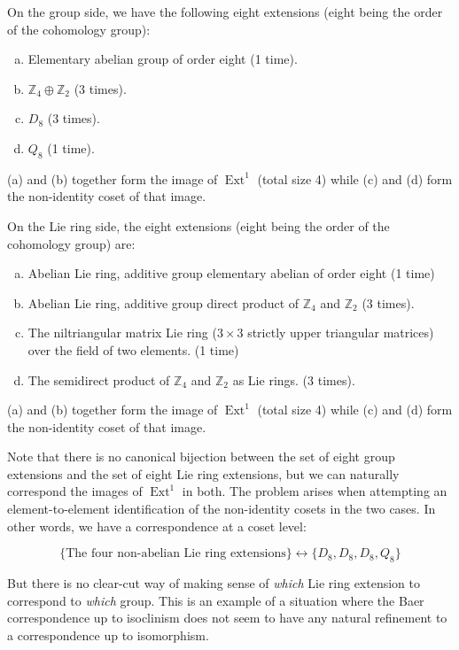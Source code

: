 \documentclass[10pt]{amsart}
\begin{document}
On the group side, we have the following eight extensions (eight being
the order of the cohomology group):

\begin{enumerate}[(a)]
\item Elementary abelian group of order eight (1 time).
\item $\mathbb{Z}_4 \oplus \mathbb{Z}_2$ (3 times).
\item $D_8$ (3 times).
\item $Q_8$ (1 time).
\end{enumerate}

(a) and (b) together form the image of $\operatorname{Ext}^1$ (total
size 4) while (c) and (d) form the non-identity coset of that
image.

On the Lie ring side, the eight extensions (eight being the order of the cohomology group) are:

\begin{enumerate}[(a)]
\item Abelian Lie ring, additive group elementary abelian of order eight (1 time)
\item Abelian Lie ring, additive group direct product of
  $\mathbb{Z}_4$ and $\mathbb{Z}_2$ (3 times).
\item The niltriangular matrix Lie ring ($3 \times 3$ strictly upper
  triangular matrices) over the field of two elements. (1 time)
\item The semidirect product of $\mathbb{Z}_4$ and $\mathbb{Z}_2$ as
  Lie rings. (3 times).
\end{enumerate}

(a) and (b) together form the image of $\operatorname{Ext}^1$ (total
size 4) while (c) and (d) form the non-identity coset of that
image.

Note that there is no canonical bijection between the set of eight
group extensions and the set of eight Lie ring extensions, but we can
naturally correspond the images of $\operatorname{Ext}^1$ in both. The
problem arises when attempting an element-to-element identification of the
non-identity cosets in the two cases. In other words, we have a
correspondence at a coset level:

$$\{ \text{The four non-abelian Lie ring extensions} \} \leftrightarrow \{ D_8, D_8, D_8, Q_8 \}$$

But there is no clear-cut way of making sense of {\em which} Lie ring
extension to correspond to {\em which} group. This is an example of a
situation where the Baer correspondence up to isoclinism does not seem
to have any natural refinement to a correspondence up to isomorphism.
\end{document}
